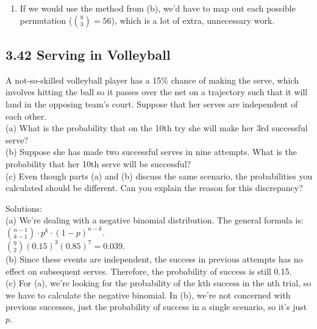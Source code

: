 \documentclass[]{article}
\providecommand{\tightlist}{%
  \setlength{\itemsep}{0pt}\setlength{\parskip}{0pt}}
\begin{document}
\begin{enumerate}
\def\labelenumi{(\alph{enumi})}
\setcounter{enumi}{2}
\tightlist
\item
  If we would use the method from (b), we'd have to map out each
  possible permutation (\(\binom{8}{3} = 56\)), which is a lot of extra,
  unnecessary work.
\end{enumerate}

\subsection{3.42 Serving in Volleyball}\label{serving-in-volleyball}

A not-so-skilled volleyball player has a 15\% chance of making the
serve, which involves hitting the ball so it passes over the net on a
trajectory such that it will land in the opposing team's court. Suppose
that her serves are independent of each other.\\
(a) What is the probability that on the 10th try she will make her 3rd
successful serve?\\
(b) Suppose she has made two successful serves in nine attempts. What is
the probability that her 10th serve will be successful?\\
(c) Even though parts (a) and (b) discuss the same scenario, the
probabilities you calculated should be different. Can you explain the
reason for this discrepancy?

Solutions:\\
(a) We're dealing with a negative binomial distribution. The general
formula is: \(\binom{n-1}{k-1}\cdot p^k\cdot(1-p)^{n-k}\).\\
\(\binom{9}{2}(0.15)^{3}(0.85)^{7} = 0.039\).\\
(b) Since these events are independent, the success in previous attempts
has no effect on subsequent serves. Therefore, the probability of
success is still 0.15.\\
(c) For (a), we're looking for the probability of the kth success in the
nth trial, so we have to calculate the negative binomial. In (b), we're
not concerned with previous successes, just the probability of success
in a single scenario, so it's just \(p\).
\end{document}
